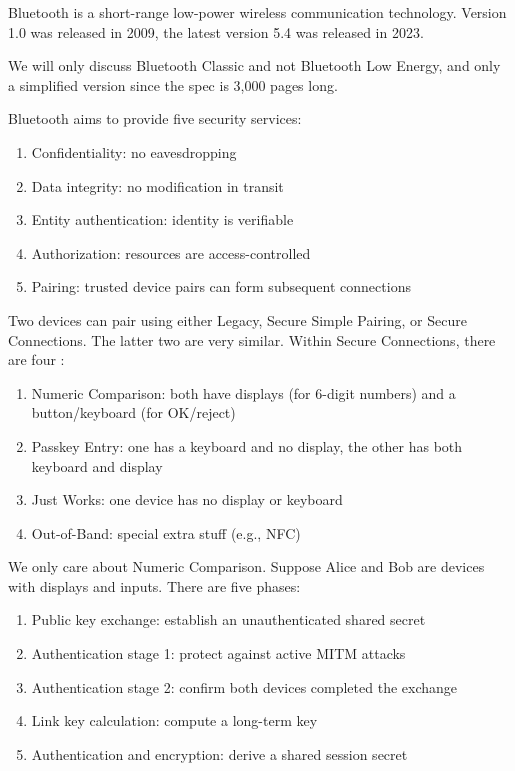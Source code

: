 \documentclass[class=co487,tikz,minted,notes]{agony}
\begin{document}
Bluetooth is a short-range low-power wireless communication technology.
Version 1.0 was released in 2009, the latest version 5.4 was released in 2023.

We will only discuss Bluetooth Classic and not Bluetooth Low Energy,
and only a simplified version since the spec is 3,000 pages long.

Bluetooth aims to provide five security services:
\begin{enumerate}[nosep]
  \item Confidentiality: no eavesdropping
  \item Data integrity: no modification in transit
  \item Entity authentication: identity is verifiable
  \item Authorization: resources are access-controlled
  \item Pairing: trusted device pairs can form subsequent connections
\end{enumerate}

Two devices can pair using either Legacy, Secure Simple Pairing,
or Secure Connections.
The latter two are very similar.
Within Secure Connections, there are four :
\begin{enumerate}[nosep]
  \item Numeric Comparison: both have displays (for 6-digit numbers) and a button/keyboard (for OK/reject)
  \item Passkey Entry: one has a keyboard and no display, the other has both keyboard and display
  \item Just Works: one device has no display or keyboard
  \item Out-of-Band: special extra stuff (e.g., NFC)
\end{enumerate}
We only care about Numeric Comparison.
Suppose Alice and Bob are devices with displays and inputs.
There are five phases:
\begin{enumerate}[nosep]
  \item Public key exchange: establish an unauthenticated shared secret
  \item Authentication stage 1: protect against active MITM attacks
  \item Authentication stage 2: confirm both devices completed the exchange
  \item Link key calculation: compute a long-term key
  \item Authentication and encryption: derive a shared session secret
\end{enumerate}
\end{document}

